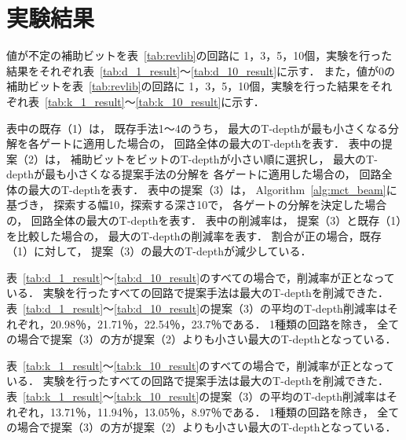 \section{実験結果}
値が不定の補助ビットを表~\ref{tab:revlib}の回路に
1，3，5，10個，実験を行った結果をそれぞれ表~\ref{tab:d_1_result}～\ref{tab:d_10_result}に示す．
また，値が0の補助ビットを表~\ref{tab:revlib}の回路に
1，3，5，10個，実験を行った結果をそれぞれ表~\ref{tab:k_1_result}～\ref{tab:k_10_result}に示す．
\par
表中の既存（1）は，
既存手法1～4のうち，
最大のT-depthが最も小さくなる分解を各ゲートに適用した場合の，
回路全体の最大のT-depthを表す．
表中の提案（2）は，
補助ビットをビットのT-depthが小さい順に選択し，
最大のT-depthが最も小さくなる提案手法の分解を
各ゲートに適用した場合の，
回路全体の最大のT-depthを表す．
表中の提案（3）は，
Algorithm~\ref{alg:mct_beam}に基づき，
探索する幅10，探索する深さ10で，
各ゲートの分解を決定した場合の，
回路全体の最大のT-depthを表す．
表中の削減率は，
提案（3）と既存（1）を比較した場合の，
最大のT-depthの削減率を表す．
割合が正の場合，既存（1）に対して，
提案（3）の最大のT-depthが減少している．
\par
表~\ref{tab:d_1_result}～\ref{tab:d_10_result}のすべての場合で，削減率が正となっている．
実験を行ったすべての回路で提案手法は最大のT-depthを削減できた．
表~\ref{tab:d_1_result}～\ref{tab:d_10_result}の提案（3）の平均のT-depth削減率はそれぞれ，20.98％，21.71％，22.54％，23.7％である．
1種類の回路を除き，
全ての場合で提案（3）の方が提案（2）よりも小さい最大のT-depthとなっている．
\par
表~\ref{tab:k_1_result}～\ref{tab:k_10_result}のすべての場合で，削減率が正となっている．
実験を行ったすべての回路で提案手法は最大のT-depthを削減できた．
表~\ref{tab:k_1_result}～\ref{tab:k_10_result}の提案（3）の平均のT-depth削減率はそれぞれ，13.71％，11.94％，13.05％，8.97％である．
1種類の回路を除き，
全ての場合で提案（3）の方が提案（2）よりも小さい最大のT-depthとなっている．
